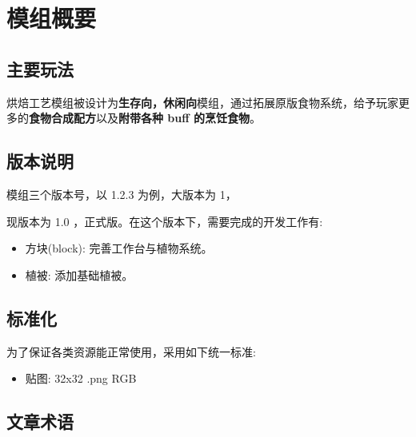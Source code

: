 \section{模组概要}
\subsection{主要玩法}

烘焙工艺模组被设计为\textbf{生存向，休闲向}模组，通过拓展原版食物系统，给予玩家更多的\textbf{食物合成配方}以及\textbf{附带各种 buff 的烹饪食物}。

\subsection{版本说明}

模组三个版本号，以 1.2.3 为例，大版本为 1，

现版本为 1.0 ，正式版。在这个版本下，需要完成的开发工作有:

\begin{itemize}
    \item 方块(block): 完善工作台与植物系统。
    \item 植被: 添加基础植被。
\end{itemize}

\subsection{标准化}

为了保证各类资源能正常使用，采用如下统一标准:
\begin{itemize}
    \item 贴图: 32x32 .png RGB
\end{itemize}

\subsection{文章术语}

